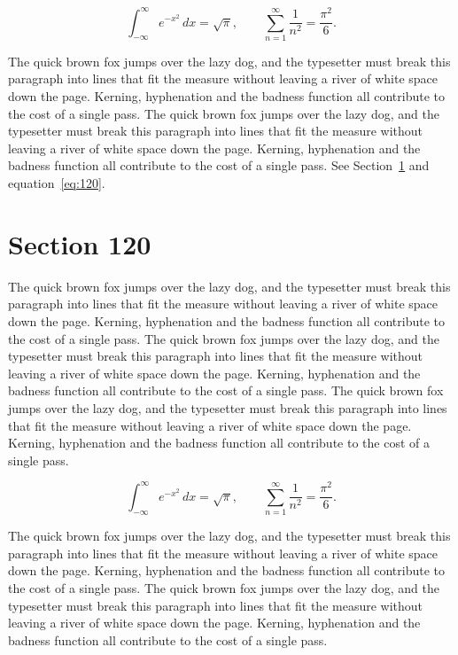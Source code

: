 \documentclass{article}
\begin{document}
\begin{equation}\label{eq:119}
\int_{-\infty}^{\infty} e^{-x^{2}}\,dx = \sqrt{\pi}, \qquad
\sum_{n=1}^{\infty} \frac{1}{n^{2}} = \frac{\pi^{2}}{6}.
\end{equation}

The quick brown fox jumps over the lazy dog, and the typesetter must break this paragraph into lines that fit the measure without leaving a river of white space down the page. Kerning, hyphenation and the badness function all contribute to the cost of a single pass. The quick brown fox jumps over the lazy dog, and the typesetter must break this paragraph into lines that fit the measure without leaving a river of white space down the page. Kerning, hyphenation and the badness function all contribute to the cost of a single pass. 
See Section~\ref{sec:120} and equation~\eqref{eq:120}.
\section{Section 120}
\label{sec:120}
The quick brown fox jumps over the lazy dog, and the typesetter must break this paragraph into lines that fit the measure without leaving a river of white space down the page. Kerning, hyphenation and the badness function all contribute to the cost of a single pass. The quick brown fox jumps over the lazy dog, and the typesetter must break this paragraph into lines that fit the measure without leaving a river of white space down the page. Kerning, hyphenation and the badness function all contribute to the cost of a single pass. The quick brown fox jumps over the lazy dog, and the typesetter must break this paragraph into lines that fit the measure without leaving a river of white space down the page. Kerning, hyphenation and the badness function all contribute to the cost of a single pass. 

\begin{equation}\label{eq:120}
\int_{-\infty}^{\infty} e^{-x^{2}}\,dx = \sqrt{\pi}, \qquad
\sum_{n=1}^{\infty} \frac{1}{n^{2}} = \frac{\pi^{2}}{6}.
\end{equation}

The quick brown fox jumps over the lazy dog, and the typesetter must break this paragraph into lines that fit the measure without leaving a river of white space down the page. Kerning, hyphenation and the badness function all contribute to the cost of a single pass. The quick brown fox jumps over the lazy dog, and the typesetter must break this paragraph into lines that fit the measure without leaving a river of white space down the page. Kerning, hyphenation and the badness function all contribute to the cost of a single pass. 
\end{document}
